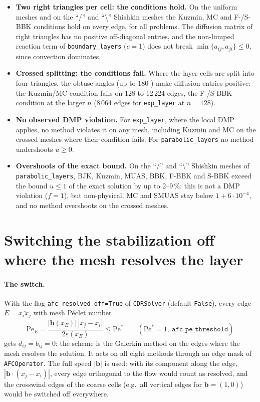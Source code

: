 \documentclass[11pt]{article}
\newcommand{\eps}{\varepsilon}
\newcommand{\bb}{\boldsymbol{b}}
\begin{document}


\begin{itemize}[leftmargin=*]
\item \textbf{Two right triangles per cell: the conditions hold.} On the uniform meshes and on the ``/'' and
  ``\textbackslash'' Shishkin meshes the Kuzmin, MC and F-/S-BBK conditions hold on every edge, for all problems. The
  diffusion matrix of right triangles has no positive off-diagonal entries, and the non-lumped reaction term of
  \texttt{boundary\_layers} ($c=1$) does not break $\min\{a_{ij},a_{ji}\}\le0$, since convection dominates.
\item \textbf{Crossed splitting: the conditions fail.} Where the layer cells are split into four triangles, the obtuse
  angles (up to $180^\circ$) make diffusion entries positive: the Kuzmin/MC condition fails on 128 to 12\,224 edges,
  the F-/S-BBK condition at the larger $n$ (8\,064 edges for \texttt{exp\_layer} at $n=128$).
\item \textbf{No observed DMP violation.} For \texttt{exp\_layer}, where the local DMP applies, no method violates it on
  any mesh, including Kuzmin and MC on the crossed meshes where their condition fails. For
  \texttt{parabolic\_layers} no method undershoots $u\ge0$.
\item \textbf{Overshoots of the exact bound.} On the ``/'' and ``\textbackslash'' Shishkin meshes of
  \texttt{parabolic\_layers}, BJK, Kuzmin, MUAS, BBK, F-BBK and S-BBK exceed the bound $u\le1$ of the exact solution by
  up to 2--9\,\%; this is not a DMP violation ($f=1$), but non-physical. MC and SMUAS stay below $1+6\cdot10^{-4}$, and
  no method overshoots on the crossed meshes.
\end{itemize}

\section{Switching the stabilization off where the mesh resolves the layer}\label{sec:roff}

\paragraph{The switch.} With the flag \texttt{afc\_resolved\_off=True} of \texttt{CDRSolver} (default \texttt{False}),
every edge $E=\overline{x_ix_j}$ with mesh P\'eclet number
\[
  \mathrm{Pe}_E=\frac{|\bb(x_E)|\,|x_j-x_i|}{2\eps(x_E)}\le\mathrm{Pe}^*\qquad(\mathrm{Pe}^*=1,\ \texttt{afc\_pe\_threshold})
\]
gets $d_{ij}=b_{ij}=0$: the scheme is the Galerkin method on the edges where the mesh resolves the solution. It acts on
all eight methods through an edge mask of \texttt{AFCOperator}. The full speed $|\bb|$ is used: with its component
along the edge, $|\bb\cdot(x_j-x_i)|$, every edge orthogonal to the flow would count as resolved, and the crosswind
edges of the coarse cells (e.g.\ all vertical edges for $\bb=(1,0)$) would be switched off everywhere.
\end{document}

